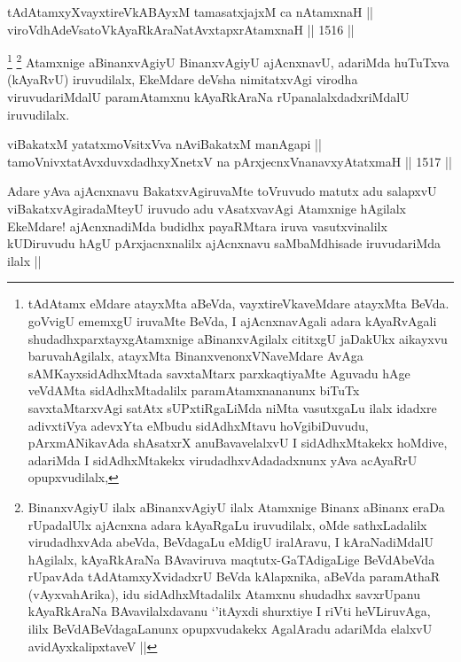\begin{shl}
tAdAtamxyXvayxtireVkABAyxM tamasatxjajxM ca nA\s \s tamxnaH || \\
viroVdhAdeVsatoV\s kAyaRkAraNatAvxtapxrAtamxnaH ||  1516 ||  
\end{shl}

\begin{artha}
\footnote{tAdAtamx eMdare atayxMta aBeVda, vayxtireVkaveMdare atayxMta BeVda. goVvigU ememxgU iruvaMte BeVda, I ajAcnxnavAgali adara kAyaRvAgali shudadhxparxtayxgAtamxnige aBinanxvAgilalx cititxgU jaDakUkx aikayxvu baruvahAgilalx, atayxMta BinanxvenonxVNaveMdare AvAga sAMKayxsidAdhxMtada savxtaMtarx parxkaqtiyaMte Aguvadu hAge veVdAMta sidAdhxMtadalilx paramAtamxnananunx biTuTx savxtaMtarxvAgi satAtx sUPxtiRgaLiMda niMta vasutxgaLu ilalx idadxre adivxtiVya adevxYta eMbudu sidAdhxMtavu hoVgibiDuvudu, pArxmANikavAda shAsatxrX anuBavavelalxvU I sidAdhxMtakekx hoMdive, adariMda I sidAdhxMtakekx virudadhxvAdadadxnunx yAva acAyaRrU opupxvudilalx,}
\footnote{BinanxvAgiyU ilalx aBinanxvAgiyU ilalx Atamxnige Binanx aBinanx eraDa rUpadalUlx ajAcnxna adara kAyaRgaLu iruvudilalx, oMde sathxLadalilx virudadhxvAda abeVda, BeVdagaLu eMdigU iralAravu, I kAraNadiMdalU hAgilalx, kAyaRkAraNa BAvaviruva maqtutx-GaTAdigaLige BeVdAbeVda rUpavAda tAdAtamxyXvidadxrU BeVda kAlapxnika, aBeVda paramAthaR (vAyxvahArika), idu sidAdhxMtadalilx Atamxnu shudadhx savxrUpanu kAyaRkAraNa BAvavilalxdavanu `\stext'itAyxdi shurxtiye I riVti heVLiruvAga, ililx BeVdABeVdagaLanunx opupxvudakekx AgalAradu adariMda elalxvU avidAyxkalipxtaveV ||}
Atamxnige aBinanxvAgiyU BinanxvAgiyU ajAcnxnavU, adariMda huTuTxva (kAyaRvU) iruvudilalx, EkeMdare deVsha nimitatxvAgi virodha viruvudariMdalU paramAtamxnu kAyaRkAraNa rUpanalalxdadxriMdalU iruvudilalx.
\end{artha}


\begin{shl}
viBakatxM yatatxmoV\s sitxVva nAviBakatxM manAgapi || \\
tamoV\s nivxtatAvxduvxdadhxyXnetxV na pArxjecnxV\s nanavxyAtatxmaH ||  1517 ||  
\end{shl}

\begin{artha}
Adare yAva ajAcnxnavu BakatxvAgiruvaMte toVruvudo matutx adu salapxvU viBakatxvAgiradaMteyU iruvudo adu vAsatxvavAgi Atamxnige hAgilalx EkeMdare! ajAcnxnadiMda budidhx payaRMtara iruva vasutxvinalilx kUDiruvudu hAgU pArxjacnxnalilx ajAcnxnavu saMbaMdhisade iruvudariMda ilalx ||
\end{artha}

